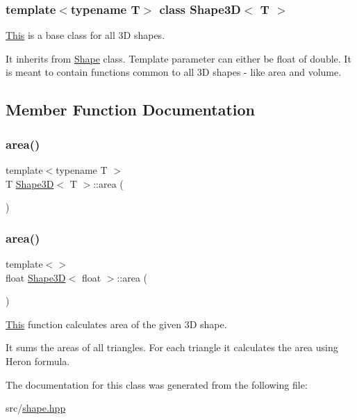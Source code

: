 \subsubsection*{template$<$typename T$>$\newline
class Shape3\+D$<$ T $>$}

\mbox{\hyperlink{classThis}{This}} is a base class for all 3D shapes. 

It inherits from \mbox{\hyperlink{classShape}{Shape}} class. Template parameter can either be float of double. It is meant to contain functions common to all 3D shapes -\/ like area and volume. 

\subsection{Member Function Documentation}
\mbox{\label{classShape3D_add8607daa60f43c6cb71e7162c107d71}} 
\subsubsection{\texorpdfstring{area()}{area()}\hspace{0.1cm}{\footnotesize\ttfamily [1/2]}}
{\footnotesize\ttfamily template$<$typename T $>$ \\
T \mbox{\hyperlink{classShape3D}{Shape3D}}$<$ T $>$\+::area (\begin{DoxyParamCaption}{ }\end{DoxyParamCaption})}

\mbox{\label{classShape3D_ae3c7c5cca570561caf09868885bea389}} 
\subsubsection{\texorpdfstring{area()}{area()}\hspace{0.1cm}{\footnotesize\ttfamily [2/2]}}
{\footnotesize\ttfamily template$<$$>$ \\
float \mbox{\hyperlink{classShape3D}{Shape3D}}$<$ float $>$\+::area (\begin{DoxyParamCaption}{ }\end{DoxyParamCaption})\hspace{0.3cm}{\ttfamily [inline]}}



\mbox{\hyperlink{classThis}{This}} function calculates area of the given 3D shape. 

It sums the areas of all triangles. For each triangle it calculates the area using Heron formula. 

The documentation for this class was generated from the following file\+:\begin{DoxyCompactItemize}
\item 
src/\mbox{\hyperlink{shape_8hpp}{shape.\+hpp}}\end{DoxyCompactItemize}
